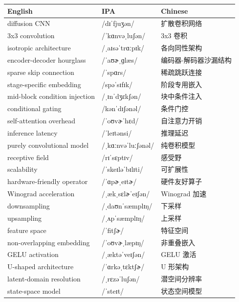 \documentclass[UTF8,12pt,a4paper]{ctexart}
\providecommand{\zh}[1]{#1}
\begin{document}
\begin{tabular*}{\textwidth}{@{\extracolsep{\fill}}lll@{}}
\toprule
\textbf{English} & \textbf{IPA} & \textbf{Chinese} \\
\midrule
diffusion CNN & {\ipafont /dɪˈfjuʒən/} & \zh{扩散卷积网络} \\
3x3 convolution & {\ipafont /ˈkɑnvəˌluʃən/} & \zh{3x3 卷积} \\
isotropic architecture & {\ipafont /ˌaɪsəˈtrɑːpɪk/} & \zh{各向同性架构} \\
encoder-decoder hourglass & {\ipafont /ˈaʊɚˌɡlæs/} & \zh{编码器-解码器沙漏结构} \\
sparse skip connection & {\ipafont /ˈspɑrs/} & \zh{稀疏跳跃连接} \\
stage-specific embedding & {\ipafont /spəˈsɪfɪk/} & \zh{阶段专用嵌入} \\
mid-block condition injection & {\ipafont /ˌɪnˈdʒɛkʃən/} & \zh{块中条件注入} \\
conditional gating & {\ipafont /kənˈdɪʃənəl/} & \zh{条件门控} \\
self-attention overhead & {\ipafont /ˈoʊvɚˈhɛd/} & \zh{自注意力开销} \\
inference latency & {\ipafont /ˈleɪtənsi/} & \zh{推理延迟} \\
purely convolutional model & {\ipafont /ˌkɑːnvəˈluːʃənəl/} & \zh{纯卷积模型} \\
receptive field & {\ipafont /rɪˈsɛptɪv/} & \zh{感受野} \\
scalability & {\ipafont /ˈskeɪləˈbɪlɪti/} & \zh{可扩展性} \\
hardware-friendly operator & {\ipafont /ˈɑpɚˌeɪtɚ/} & \zh{硬件友好算子} \\
Winograd acceleration & {\ipafont /ˌækˌsɛlɚˈeɪʃən/} & \zh{Winograd 加速} \\
downsampling & {\ipafont /ˌdaʊnˈsæmplɪŋ/} & \zh{下采样} \\
upsampling & {\ipafont /ˌʌpˈsæmplɪŋ/} & \zh{上采样} \\
feature space & {\ipafont /ˈfitʃɚ/} & \zh{特征空间} \\
non-overlapping embedding & {\ipafont /ˈoʊvɚˌlæpɪŋ/} & \zh{非重叠嵌入} \\
GELU activation & {\ipafont /ˌæktəˈveɪʃən/} & \zh{GELU 激活} \\
U-shaped architecture & {\ipafont /ˈɑrkəˌtɛktʃɚ/} & \zh{U 形架构} \\
latent-domain resolution & {\ipafont /ˌrɛzəˈluʃən/} & \zh{潜空间分辨率} \\
state-space model & {\ipafont /ˈsteɪt/} & \zh{状态空间模型} \\

\end{tabular*}
\end{document}
